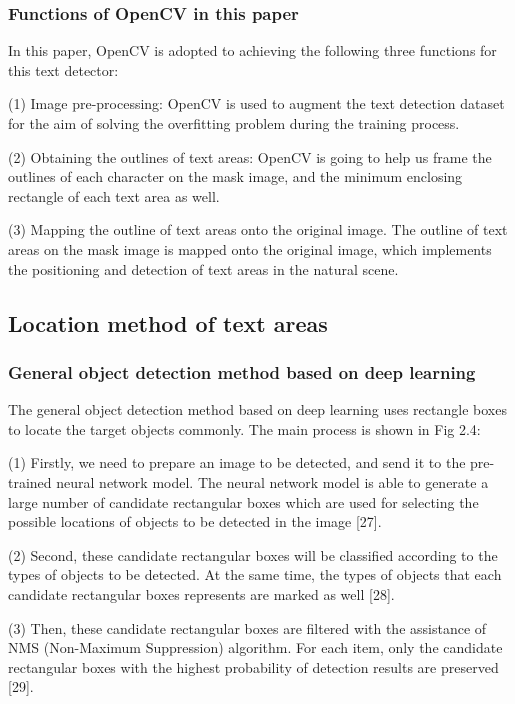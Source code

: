 \documentclass[22pt, UTF8]{article}
\numberwithin{figure}{section}
\numberwithin{table}{section}
\numberwithin{equation}{section} %
\begin{document}
\subsubsection{Functions of OpenCV in this paper}

\setlength\parindent{2em} In this paper, OpenCV is adopted to achieving the following three functions for this text detector:

\setlength\parindent{2em} (1) Image pre-processing: OpenCV is used to augment the text detection dataset for the aim of solving the overfitting problem during the training process.

\setlength\parindent{2em} (2) Obtaining the outlines of text areas: OpenCV is going to help us frame the outlines of each character on the mask image, and the minimum enclosing rectangle of each text area as well.

\setlength\parindent{2em} (3) Mapping the outline of text areas onto the original image. The outline of text areas on the mask image is mapped onto the original image, which implements the positioning and detection of text areas in the natural scene.

\subsection{Location method of text areas}

\subsubsection{General object detection method based on deep learning}

\setlength\parindent{2em} The general object detection method based on deep learning uses rectangle boxes to locate the target objects commonly. The main process is shown in Fig 2.4:

\setlength\parindent{2em} (1) Firstly, we need to prepare an image to be detected, and send it to the pre-trained neural network model. The neural network model is able to generate a large number of candidate rectangular boxes which are used for selecting the possible locations of objects to be detected in the image [27].

\setlength\parindent{2em} (2) Second, these candidate rectangular boxes will be classified according to the types of objects to be detected. At the same time, the types of objects that each candidate rectangular boxes represents are marked as well [28].

\setlength\parindent{2em} (3) Then, these candidate rectangular boxes are filtered with the assistance of NMS (Non-Maximum Suppression) algorithm. For each item, only the candidate rectangular boxes with the highest probability of detection results are preserved [29].
\end{document}
